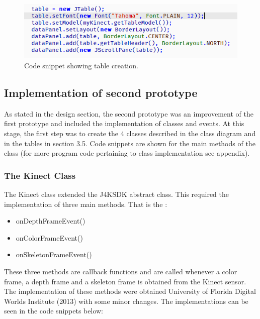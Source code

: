 \documentclass[a4paper, 12pt]{article}
\begin{document}
\begin{figure}[!htb]
	\begin{center}
  \includegraphics[scale=0.7]{codesnippet4.png}
  	\caption{Code snippet showing table creation.}
  \end{center} 
  \label{fig: codesnippet4} 
\end{figure}

\subsection{Implementation of second prototype}

As stated in the design section, the second prototype was an improvement of the first prototype and included the implementation of classes and events. At this stage, the first step was to create the 4 classes described in the class diagram and in the tables in section 3.5. Code snippets are shown for the main methods of the class (for more program code pertaining to class implementation see appendix).

\subsubsection{The Kinect Class}

The Kinect class extended the J4KSDK abstract class. This required the implementation of three main methods. That is the : 

\begin{itemize}
 \item onDepthFrameEvent()
 \item onColorFrameEvent()
 \item onSkeletonFrameEvent()
\end{itemize}  

These three methods are callback functions and are called whenever a color frame, a depth frame and a skeleton frame is obtained from the Kinect sensor. The implementation of these methods were obtained University of Florida Digital Worlds Institute (2013) with some minor changes. The implementations can be seen in the code snippets below: 
\end{document}
